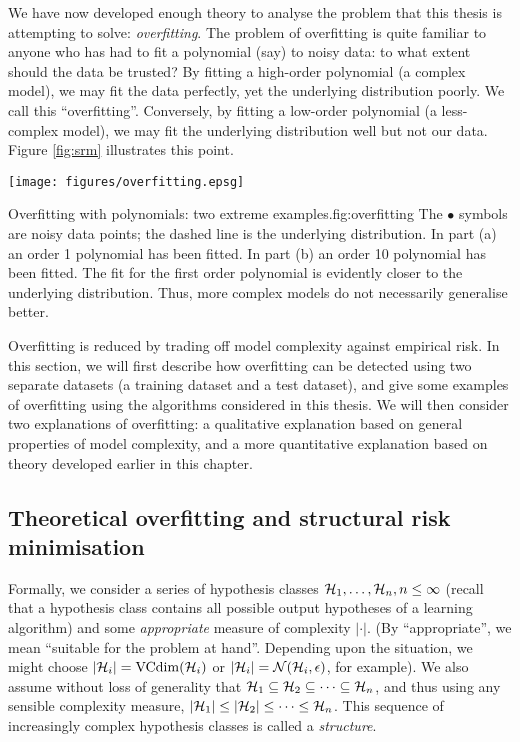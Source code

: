 We have now developed enough theory to analyse the problem that
this thesis is attempting to solve: \emph{overfitting}.  The problem
of overfitting is quite familiar to anyone who has had to fit a
polynomial (say) to noisy data: to what extent should the data be
trusted?  By fitting a high-order polynomial (a complex model), we may
fit the data perfectly, yet the underlying distribution poorly.  We
call this ``overfitting''.  Conversely, by fitting a low-order
polynomial (a less-complex model), we may fit the underlying
distribution well but not our data.  Figure \ref{fig:srm} illustrates
this point.

\begin{linefigure}
\begin{center}
\texttt{[image: figures/overfitting.epsg]}
\end{center}
\begin{capt}{Overfitting with polynomials: two extreme
examples.}{fig:overfitting}
The $\bullet$ symbols are noisy data points; the dashed line is the
underlying distribution.  In part (a) an order 1 polynomial has been
fitted.  In part (b) an order 10 polynomial has been fitted.  The fit
for the first order polynomial is evidently closer to the underlying
distribution.  Thus, more complex models do not necessarily generalise
better.
\end{capt}
\end{linefigure}

Overfitting is reduced by trading off model complexity against
empirical risk.  In this section, we will first describe how 
overfitting can be detected using two separate datasets (a training
dataset and a test dataset), and give some examples of overfitting
using the algorithms considered in this thesis.  We will then consider
two explanations of overfitting: a qualitative explanation based on
general properties of model complexity, and a more quantitative
explanation based on theory developed earlier in this chapter.


\subsection{Theoretical overfitting and structural risk minimisation}
\label{sec:theoretical overfitting}
\label{acr:srm}

Formally, we consider a series of hypothesis classes $\mathcal{H}_1, \ldots,
\mathcal{H}_n, n \leq \infty$ (recall that a hypothesis class contains all
possible output hypotheses of a learning algorithm) and some
\emph{appropriate} measure of complexity  $|\cdot|$.  (By
``appropriate'', we mean ``suitable for the problem at
hand''. Depending upon the situation, we might choose $|\mathcal{H}_i| =
\mathrm{VCdim}(\mathcal{H}_i)$ or $|\mathcal{H}_i| = \mathcal{N}({\mathcal{H}_i}, {\epsilon})$, for
example).  We also assume without loss of generality that $\mathcal{H}_1
\subseteq \mathcal{H}_2 \subseteq \cdots \subseteq \mathcal{H}_n$, and thus using
any sensible complexity measure, $|\mathcal{H}_1| \leq |\mathcal{H}_2| \leq \cdots
\leq \mathcal{H}_n$.  This sequence of increasingly complex hypothesis
classes is called a \emph{structure}.

